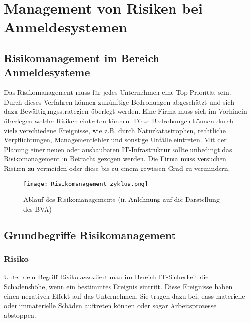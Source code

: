 \chapter{Management von Risiken bei Anmeldesystemen}

\section{Risikomanagement im Bereich Anmeldesysteme}
Das Risikomanagement muss für jedes Unternehmen eine Top-Priorität sein. Durch dieses Verfahren können zukünftige Bedrohungen abgeschätzt und sich dazu Bewältigungsstrategien überlegt werden. Eine Firma muss sich im Vorhinein überlegen welche Risiken eintreten können. Diese Bedrohungen können durch viele verschiedene Ereignisse, wie z.B. durch Naturkatastrophen, rechtliche Verpflichtungen, Managementfehler und sonstige Unfälle eintreten.
Mit der Planung einer neuen oder ausbaubaren IT-Infrastruktur sollte unbedingt das Risikomanagement in Betracht gezogen werden. Die Firma muss versuchen Risiken zu vermeiden oder diese bis zu einem gewissen Grad zu vermindern. 

\begin{center}
\begin{figure}[h]
    \centering
    \texttt{[image: Risikomanagement\_zyklus.png]}
    \caption{Ablauf des Risikomanagements (in Anlehnung auf die Darstellung des BVA)}
\end{figure}
\end{center}


\section{Grundbegriffe Risikomanagement}
\subsection{Risiko}
Unter dem Begriff Risiko assoziiert man im Bereich IT-Sicherheit die Schadenshöhe, wenn ein bestimmtes Ereignis eintritt. Diese Ereignisse haben einen negativen Effekt auf das Unternehmen. Sie tragen dazu bei, dass materielle oder immaterielle Schäden auftreten können oder sogar Arbeitsprozesse abstoppen.


